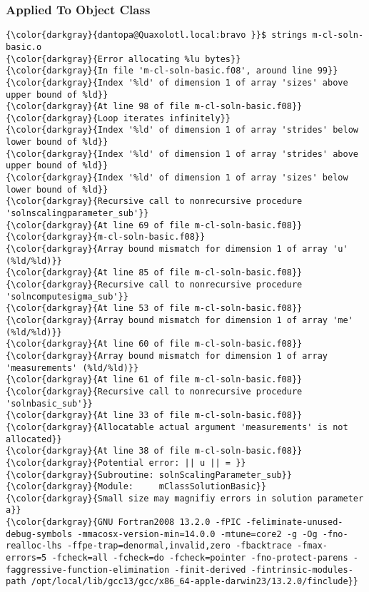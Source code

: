 		\subsubsection{Applied To Object Class}
{\footnotesize{
\begin{Verbatim}[commandchars=\\\{\}]
{\color{darkgray}{dantopa@Quaxolotl.local:bravo }}$ strings m-cl-soln-basic.o
{\color{darkgray}{Error allocating %lu bytes}}
{\color{darkgray}{In file 'm-cl-soln-basic.f08', around line 99}}
{\color{darkgray}{Index '%ld' of dimension 1 of array 'sizes' above upper bound of %ld}}
{\color{darkgray}{At line 98 of file m-cl-soln-basic.f08}}
{\color{darkgray}{Loop iterates infinitely}}
{\color{darkgray}{Index '%ld' of dimension 1 of array 'strides' below lower bound of %ld}}
{\color{darkgray}{Index '%ld' of dimension 1 of array 'strides' above upper bound of %ld}}
{\color{darkgray}{Index '%ld' of dimension 1 of array 'sizes' below lower bound of %ld}}
{\color{darkgray}{Recursive call to nonrecursive procedure 'solnscalingparameter_sub'}}
{\color{darkgray}{At line 69 of file m-cl-soln-basic.f08}}
{\color{darkgray}{m-cl-soln-basic.f08}}
{\color{darkgray}{Array bound mismatch for dimension 1 of array 'u' (%ld/%ld)}}
{\color{darkgray}{At line 85 of file m-cl-soln-basic.f08}}
{\color{darkgray}{Recursive call to nonrecursive procedure 'solncomputesigma_sub'}}
{\color{darkgray}{At line 53 of file m-cl-soln-basic.f08}}
{\color{darkgray}{Array bound mismatch for dimension 1 of array 'me' (%ld/%ld)}}
{\color{darkgray}{At line 60 of file m-cl-soln-basic.f08}}
{\color{darkgray}{Array bound mismatch for dimension 1 of array 'measurements' (%ld/%ld)}}
{\color{darkgray}{At line 61 of file m-cl-soln-basic.f08}}
{\color{darkgray}{Recursive call to nonrecursive procedure 'solnbasic_sub'}}
{\color{darkgray}{At line 33 of file m-cl-soln-basic.f08}}
{\color{darkgray}{Allocatable actual argument 'measurements' is not allocated}}
{\color{darkgray}{At line 38 of file m-cl-soln-basic.f08}}
{\color{darkgray}{Potential error: || u || = }}
{\color{darkgray}{Subroutine: solnScalingParameter_sub}}
{\color{darkgray}{Module:     mClassSolutionBasic}}
{\color{darkgray}{Small size may magnifiy errors in solution parameter a}}
{\color{darkgray}{GNU Fortran2008 13.2.0 -fPIC -feliminate-unused-debug-symbols -mmacosx-version-min=14.0.0 -mtune=core2 -g -Og -fno-realloc-lhs -ffpe-trap=denormal,invalid,zero -fbacktrace -fmax-errors=5 -fcheck=all -fcheck=do -fcheck=pointer -fno-protect-parens -faggressive-function-elimination -finit-derived -fintrinsic-modules-path /opt/local/lib/gcc13/gcc/x86_64-apple-darwin23/13.2.0/finclude}}

\end{Verbatim}}}
